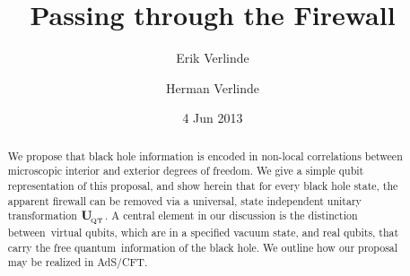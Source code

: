 \documentclass[12pt,onecolumn,aps,prd,nofootinbib,superscriptaddress,amssymb]{revtex4-1}
\def\be{\begin{equation}}
\def\ee{\end{equation}}
\begin{document}
\title{Passing through the Firewall}

\author{Erik Verlinde}


\def\spc{\hspace{.5pt}}


\author{Herman Verlinde}

\date{4 Jun 2013}

\begin{abstract}

We propose that black hole information is encoded in non-local correlations
between microscopic interior and exterior degrees of freedom. 
We give a simple qubit representation of this proposal, and show herein that for every black hole state, the apparent firewall can be removed 
via a universal, state independent unitary transformation ${\bf U}_{{\! }_{\rm QT}}$.  
A central element in our discussion is the distinction between~virtual qubits, which are in a specified vacuum state, and real qubits, that carry the free quantum~information of the black hole. We outline how our proposal may be realized in AdS/CFT.


\end{abstract}


\def\be{\begin{equation}}
\def\ee{\end{equation}}
\maketitle
\def\mathbi#1{\textbf{\em #1}} 
\def\la{\langle}
\def\bea{\begin{eqnarray}}
\def\eea{\end{eqnarray}}
\def\is{\! & \! = \! & \!}
\def\half{{\textstyle{\frac 12}}}

\def\ba{\begin{eqnarray}}
\def\ea{\end{eqnarray}}
\end{document}

